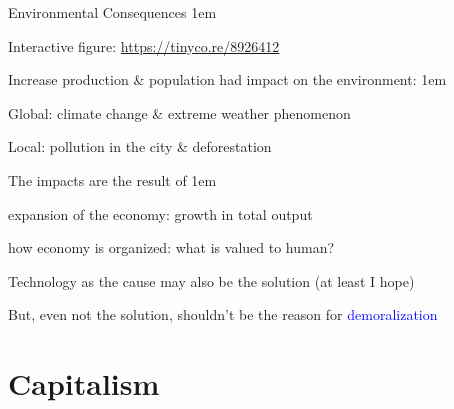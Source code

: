 \documentclass[11pt,aspectratio=43,usenames,dvipsnames]{beamer}
\newcommand{\blue}[1]{\textcolor{blue}{#1}}
\let\olditemize=\itemize
\let\endolditemize=\enditemize
\renewenvironment{itemize}{\olditemize \itemsep1em}{\endolditemize}
\theoremstyle{definition}
\begin{document}
\begin{frame}{Environmental Consequences}
\label{slide:Environmental_Consequences}
    \begin{itemize}
        \item Interactive figure: \blue{\url{https://tinyco.re/8926412}}
        \item Increase production \& population had impact on the environment:
        \begin{itemize}
            \item Global: climate change \& extreme weather phenomenon
            \item Local: pollution in the city \& deforestation
        \end{itemize}
        \item The impacts are the result of
        \begin{itemize}
            \item expansion of the economy: growth in total output
            \item how economy is organized: what is valued to human?
        \end{itemize}
        \item Technology as the cause may also be the solution (at least I hope)
        \item But, even not the solution, shouldn't be the reason for \blue{demoralization}
    \end{itemize}


\end{frame}

\section{Capitalism}
\label{sec:Capitalism}
\end{document}
